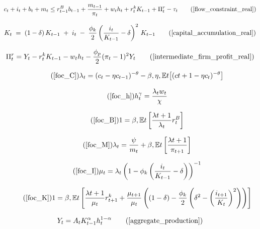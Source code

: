 \documentclass[11pt,preprint]{elsarticle}
\numberwithin{equation}{section}
\numberwithin{figure}{section}
\numberwithin{table}{section}
\begin{document}
\begin{equation}
c_t + i_t + b_t + m_t \leq r^B_{t-1}b_{t-1} + \dfrac{m_{t-1}}{\pi_t} + w_t h_t + r^k_t K_{t-1} + \Pi^r_t - \tau_t
\tag{\ref{flow_constraint_real}}
\end{equation}

\begin{equation}
K_t
\;=\;
(1 - \delta)\,K_{t-1}
\;+\; i_t
\;-\;\frac{\phi_k}{2}
\left(\frac{i_t}{K_{t-1}} - \delta\right)^{2}
\,K_{t-1}
\tag{\ref{capital_accumulation_real}}
\end{equation}

\begin{equation}
\Pi^r_t = Y_t - r^k_t K_{t-1} - w_t h_t - \dfrac{\phi_p}{2} (\pi_t - 1)^2 Y_t
\tag{\ref{intermediate_firm_profit_real}}
\end{equation}

\begin{equation}\tag{\ref{foc_C}}
\lambda_t = (c_t-\eta c_{t-1})^{-\theta} - \beta,\eta,\mathbb{E}t\bigl[(c{t+1}-\eta c_t)^{-\theta}\bigr]
\end{equation}

\begin{equation}\tag{\ref{foc_h}}
h_t^{\gamma} = \frac{\lambda_t w_t}{\chi}
\end{equation}

\begin{equation}\tag{\ref{foc_B}}
1 = \beta , \mathbb{E}t \left[ \frac{\lambda{t+1}}{\lambda_t} r^B_t \right]
\end{equation}

\begin{equation}\tag{\ref{foc_M}}
\lambda_t = \dfrac{\psi}{m_t} + \beta , \mathbb{E}t \left[ \dfrac{\lambda{t+1}}{\pi_{t+1}} \right]
\end{equation}

\begin{equation}\tag{\ref{foc_I}}
\mu_t = \lambda_t \left( 1 - \phi_k \left( \frac{i_t}{K_{t-1}} - \delta \right) \right)^{-1}
\end{equation}

\begin{equation}\tag{\ref{foc_K}}
1 = \beta , \mathbb{E}t \left[ \frac{\lambda{t+1}}{\mu_t} r^k_{t+1} + \frac{\mu_{t+1}}{\mu_t} \left( (1-\delta) - \frac{\phi_k}{2} \left( \delta^2 - \left( \frac{i_{t+1}}{K_t} \right)^2 \right) \right) \right]
\end{equation}

\begin{equation}
Y_t = A_t K_{t-1}^{\alpha} h_t^{1-\alpha}  \tag{\ref{aggregate_production}}
\end{equation}
\end{document}
